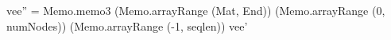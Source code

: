 vee'' =
  Memo.memo3 (Memo.arrayRange (Mat, End)) 
             (Memo.arrayRange (0, numNodes))
             (Memo.arrayRange (-1, seqlen)) 
             vee'
